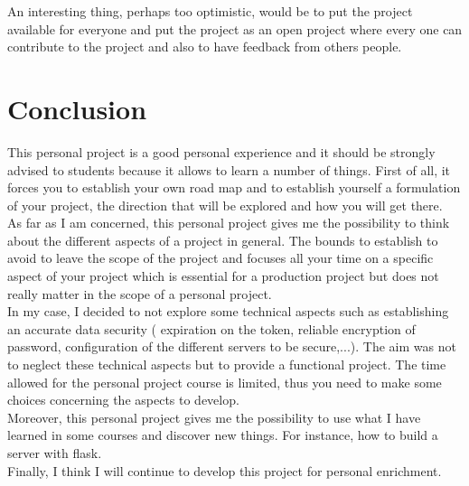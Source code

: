 An interesting thing, perhaps too optimistic, would be to put the project available for everyone and put the project as an open project where every one can contribute to the project and also to have feedback from others people.

\section{Conclusion}
This personal project is a good personal experience and it should be strongly advised to students because it allows to learn a number of things. First of all, it forces you to establish your own road map and to establish yourself a formulation of your project, the direction that will be explored and how you will get there.\\

As far as I am concerned, this personal project gives me the possibility to think about the different aspects of a project in general. The bounds to establish to avoid to leave the scope of the project and focuses all your time on a specific aspect of your project which is essential for a production project but does not really matter in the scope of a personal project.\\

In my case, I decided to not explore some technical aspects such as establishing an accurate data security ( expiration on the token, reliable encryption of password, configuration of the different servers to be secure,...). The aim was not to neglect these technical aspects but to provide a functional project. The time allowed for the personal project course is limited, thus you need to make some choices concerning the aspects to develop.\\

Moreover, this personal project gives me the possibility to use what I have learned in some courses and discover new things. For instance, how to build a server with flask.\\

Finally, I think I will continue to develop this project for personal enrichment.